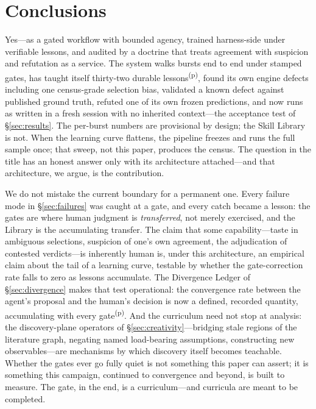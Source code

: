 \documentclass[twocolumn]{aastex631}
\newcommand{\prov}{\textsuperscript{(p)}}   %
\begin{document}
\section{Conclusions} \label{sec:conclusions}
Yes---as a gated workflow with bounded agency, trained harness-side under
verifiable lessons, and audited by a doctrine that treats agreement with
suspicion and refutation as a service. The system walks bursts end to end
under stamped gates, has taught itself thirty-two durable lessons\prov,
found its own engine defects including one census-grade
selection bias, validated a known defect against published ground truth,
refuted one of its own frozen predictions, and now runs as written in a
fresh session with no inherited context---the acceptance test of
\S\ref{sec:results}. The per-burst numbers are provisional by design; the Skill
Library is not. When the learning curve flattens, the pipeline freezes and
runs the full sample once; that sweep, not this paper, produces the census.
The question in the title has an honest answer only with its architecture
attached---and that architecture, we argue, is the contribution.

We do not mistake the current boundary for a permanent one. Every failure
mode in \S\ref{sec:failures} was caught at a gate, and every catch became a
lesson: the gates are where human judgment is \emph{transferred}, not merely
exercised, and the Library is the accumulating transfer. The claim that some
capability---taste in ambiguous selections, suspicion of one's own
agreement, the adjudication of contested verdicts---is inherently human is,
under this architecture, an empirical claim about the tail of a learning
curve, testable by whether the gate-correction rate falls to zero as
lessons accumulate. The Divergence Ledger of \S\ref{sec:divergence} makes
that test operational: the convergence rate between the agent's proposal
and the human's decision is now a defined, recorded quantity, accumulating
with every gate\prov.
And the curriculum need not stop at analysis: the
discovery-plane operators of \S\ref{sec:creativity}---bridging stale regions
of the literature graph, negating named load-bearing assumptions,
constructing new observables---are mechanisms by which discovery itself
becomes teachable. Whether the gates ever go fully quiet is not something
this paper can assert; it is something this campaign, continued to
convergence and beyond, is built to measure. The gate, in the end, is a
curriculum---and curricula are meant to be completed.
\end{document}
